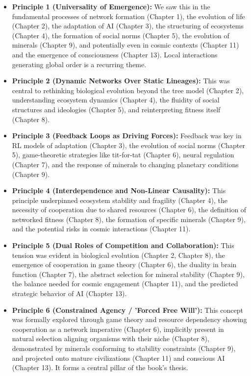 \begin{itemize}
    \item \textbf{Principle 1 (Universality of Emergence):} We saw this in the fundamental processes of network formation (Chapter 1), the evolution of life (Chapter 2), the adaptation of AI (Chapter 3), the structuring of ecosystems (Chapter 4), the formation of social norms (Chapter 5), the evolution of minerals (Chapter 9), and potentially even in cosmic contexts (Chapter 11) and the emergence of consciousness (Chapter 13). Local interactions generating global order is a recurring theme.

    \item \textbf{Principle 2 (Dynamic Networks Over Static Lineages):} This was central to rethinking biological evolution beyond the tree model (Chapter 2), understanding ecosystem dynamics (Chapter 4), the fluidity of social structures and ideologies (Chapter 5), and reinterpreting fitness itself (Chapter 8).

    \item \textbf{Principle 3 (Feedback Loops as Driving Forces):} Feedback was key in RL models of adaptation (Chapter 3), the evolution of social norms (Chapter 5), game-theoretic strategies like tit-for-tat (Chapter 6), neural regulation (Chapter 7), and the response of minerals to changing planetary conditions (Chapter 9).

    \item \textbf{Principle 4 (Interdependence and Non-Linear Causality):} This principle underpinned ecosystem stability and fragility (Chapter 4), the necessity of cooperation due to shared resources (Chapter 6), the definition of networked fitness (Chapter 8), the formation of specific minerals (Chapter 9), and the potential risks in cosmic interactions (Chapter 11).

    \item \textbf{Principle 5 (Dual Roles of Competition and Collaboration):} This tension was evident in biological evolution (Chapter 2, Chapter 8), the emergence of cooperation in game theory (Chapter 6), the duality in brain function (Chapter 7), the abstract selection for mineral stability (Chapter 9), the balance needed for cosmic engagement (Chapter 11), and the predicted strategic behavior of AI (Chapter 13).

    \item \textbf{Principle 6 (Constrained Agency / 'Forced Free Will'):} This concept was formally explored through game theory and resource dependency showing cooperation as a network imperative (Chapter 6), implicitly present in natural selection aligning organisms with their niche (Chapter 8), demonstrated by minerals conforming to stability constraints (Chapter 9), and projected onto mature civilizations (Chapter 11) and conscious AI (Chapter 13). It forms a central pillar of the book's thesis.


\end{itemize}

